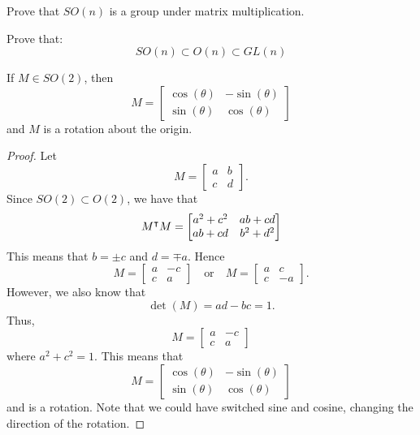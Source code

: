 \documentclass{ximera}
\begin{document}
\begin{exercise}
  Prove that $SO(n)$ is a group under matrix multiplication.
\end{exercise}


\begin{exercise}
  Prove that:
  \[
  SO(n) \subset O(n) \subset GL(n)
  \]
\end{exercise}

\begin{lemma}\label{L:SO}
  If $M\in SO(2)$, then
  \[
  M =
  \begin{bmatrix}
    \cos(\theta) & -\sin(\theta) \\
    \sin(\theta) & \cos(\theta)
  \end{bmatrix}
  \]
  and $M$ is a rotation about the origin.
  \begin{proof}
    Let
    \[
    M=
    \begin{bmatrix}
      a & b \\
      c & d
    \end{bmatrix}.
    \]
    Since $SO(2) \subset O(2)$, we have that
    \[
    M^\intercal M =
    \begin{bmatrix}
      a^2+c^2 & ab+cd\\
      ab + cd & b^2+d^2
    \end{bmatrix}
    \]
    This means that $b= \pm c$ and $d = \mp a$. Hence
    \[
    M = \begin{bmatrix}
      a & -c \\
      c & a
    \end{bmatrix}
    \quad\text{or}\quad
    M = \begin{bmatrix}
      a & c \\
      c & -a
    \end{bmatrix}.
    \]
    However, we also know that
    \[
    \det(M)  = ad-bc = 1.
    \]
    Thus, 
    \[
     M = \begin{bmatrix}
      a & -c \\
      c & a
    \end{bmatrix}
     \]
     where $a^2 + c^2 = 1$. This means that
     \[
     M =
     \begin{bmatrix}
       \cos(\theta) & -\sin(\theta) \\
       \sin(\theta) & \cos(\theta)
     \end{bmatrix}
     \]
     and is a rotation. Note that we could have switched sine and
     cosine, changing the direction of the rotation.
  \end{proof}
\end{lemma}
\end{document}
